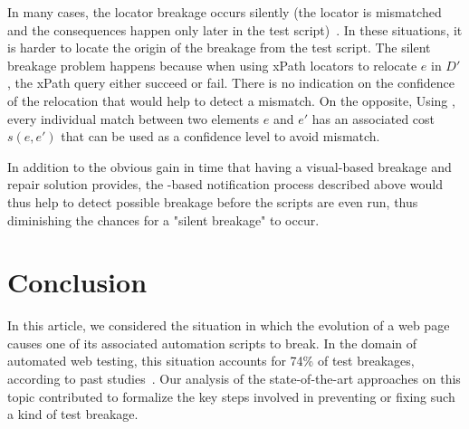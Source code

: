 \documentclass[preprint, 12pt]{elsarticle}
\begin{document}
In many cases, the locator breakage occurs silently (the locator is mismatched
and the consequences happen only later in the test
script)~\cite{stocco2018visual}. In these situations, it is harder to locate the
origin of the breakage from the test script. The silent breakage problem happens
because when using xPath locators to relocate $e$ in $D'$, the xPath query
either succeed or fail. There is no indication on the confidence of the
relocation that would help to detect a mismatch. On the opposite, Using
\erratum{}, every individual match between two elements $e$ and $e'$ has an
associated cost $s(e, e')$ that can be used as a confidence level to avoid
mismatch.

In addition to the obvious gain in time that having a visual-based breakage and
repair solution provides, the \erratum-based notification process described
above would thus help to detect possible breakage before the scripts are even
run, thus diminishing the chances for a "silent breakage" to occur.


\section{Conclusion}\label{sec:conclusion}
In this article, we considered the situation in which the evolution of a web page causes one of its associated automation scripts to break.
In the domain of automated web testing, this situation accounts for 74\% of test breakages, according to past studies~\cite{hammoudi2016record}.
% 
Our analysis of the state-of-the-art approaches on this topic contributed to formalize the key steps involved in preventing or fixing such a kind of test breakage.
\end{document}
